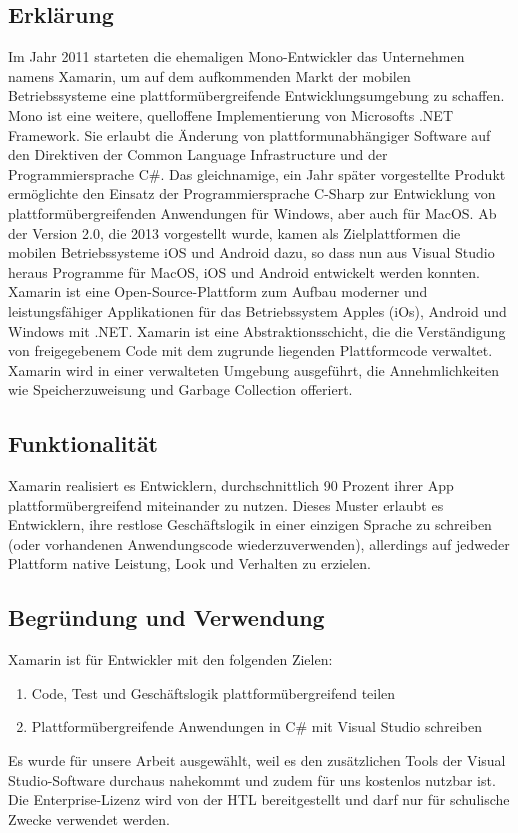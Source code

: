 \subsection*{Erklärung}
Im Jahr 2011 starteten die ehemaligen Mono-Entwickler das Unternehmen 
namens Xamarin, um auf dem aufkommenden Markt der mobilen Betriebssysteme 
eine plattformübergreifende Entwicklungsumgebung zu schaffen. 
Mono ist eine weitere, quelloffene Implementierung von Microsofts .NET Framework. 
Sie erlaubt die Änderung von plattformunabhängiger Software auf den Direktiven 
der Common Language Infrastructure und der Programmiersprache C\#.
Das gleichnamige, ein Jahr später vorgestellte Produkt ermöglichte den 
Einsatz der Programmiersprache C-Sharp zur Entwicklung von 
plattformübergreifenden Anwendungen für Windows, aber auch für MacOS. 
Ab der Version 2.0, die 2013 vorgestellt wurde, kamen als Zielplattformen 
die mobilen Betriebssysteme iOS und Android dazu, so dass nun aus Visual 
Studio heraus Programme für MacOS, iOS und Android entwickelt werden 
konnten. 
Xamarin ist eine Open-Source-Plattform zum Aufbau moderner 
und leistungsfähiger Applikationen für das Betriebssystem Apples (iOs), 
Android und Windows mit .NET. Xamarin ist eine Abstraktionsschicht, 
die die Verständigung von freigegebenem Code mit dem zugrunde liegenden 
Plattformcode verwaltet. Xamarin wird in einer verwalteten Umgebung 
ausgeführt, die Annehmlichkeiten wie Speicherzuweisung und Garbage 
Collection offeriert.
\subsection*{Funktionalität}
Xamarin realisiert es Entwicklern, durchschnittlich 90 Prozent ihrer App 
plattformübergreifend miteinander zu nutzen. Dieses Muster erlaubt es 
Entwicklern, ihre restlose Geschäftslogik in einer einzigen Sprache 
zu schreiben (oder vorhandenen Anwendungscode wiederzuverwenden), 
allerdings auf jedweder Plattform native Leistung, Look und Verhalten 
zu erzielen.
\subsection*{Begründung und Verwendung}
Xamarin ist für Entwickler mit den folgenden Zielen:
\begin{enumerate}
    \item Code, Test und Geschäftslogik plattformübergreifend teilen
    \item Plattformübergreifende Anwendungen in C\# mit Visual Studio schreiben
\end{enumerate}
Es wurde für unsere Arbeit ausgewählt, weil es den zusätzlichen Tools 
der Visual Studio-Software durchaus nahekommt und zudem für uns kostenlos 
nutzbar ist. Die Enterprise-Lizenz wird von der HTL bereitgestellt und 
darf nur für schulische Zwecke verwendet werden.